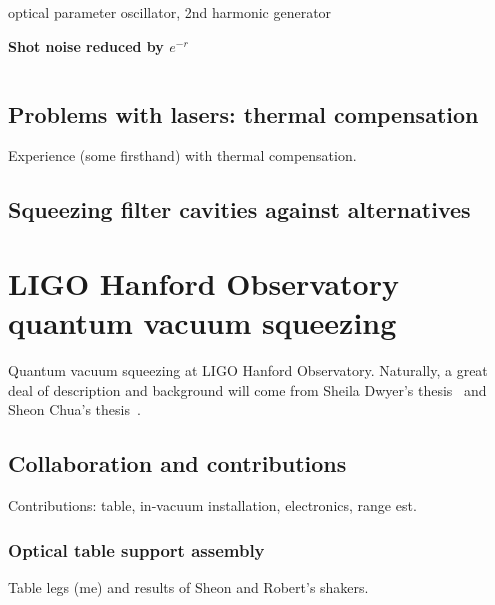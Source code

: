 optical parameter oscillator, 2nd harmonic generator


\textbf{Shot noise reduced by $e^{-r}$}


\[
\]




        \subsection{Problems with lasers: thermal compensation}
        \label{TCS}

            Experience (some firsthand) with thermal compensation.

        \subsection{Squeezing filter cavities against alternatives}
        \label{third-gen_squeezing}

    \section{LIGO Hanford Observatory quantum vacuum squeezing}
    \label{LHO_squeeze}

        Quantum vacuum squeezing at LIGO Hanford Observatory. Naturally, a great deal of description and background will come from Sheila Dwyer's thesis~\cite{DwyerThesis} and Sheon Chua's thesis~\cite{ChuaThesis}.

        \subsection{Collaboration and contributions}
        \label{contributions}

            Contributions: table, in-vacuum installation, electronics, range est.

            \subsubsection{Optical table support assembly}
            \label{table_legs}

                Table legs (me) and results of Sheon and Robert's shakers.

